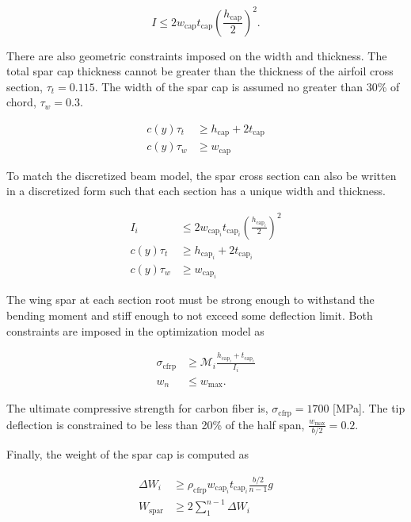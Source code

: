 \begin{equation}
    \label{e:moispar}
    I \leq 2w_{\text{cap}}t_{\text{cap}}\left(\frac{h_{\text{cap}}}{2}\right)^2.
\end{equation}

There are also geometric constraints imposed on the width and thickness.  The total spar cap thickness cannot be greater than the thickness of the airfoil cross section, $\tau_t = 0.115$.  The width of the spar cap is assumed no greater than 30\% of chord, $\tau_w = 0.3$.

\begin{align}
    \label{e:thickness}
    c(y)\tau_t &\geq h_{\text{cap}} + 2t_{\text{cap}} \\
    \label{e:width}
    c(y)\tau_w &\geq w_{\text{cap}} 
    \end{align}

To match the discretized beam model, the spar cross section can also be written in a discretized form such that each section has a unique width and thickness. 

\begin{align}
    I_i &\leq 2w_{\text{cap}_i}t_{\text{cap}_i}\left(\frac{h_{\text{cap}_i}}{2}\right)^2 \\
    c(y)\tau_t &\geq h_{\text{cap}_i} + 2t_{\text{cap}_i} \\
    c(y)\tau_w &\geq w_{\text{cap}_i} 
\end{align}

The wing spar at each section root must be strong enough to withstand the bending moment and stiff enough to not exceed some deflection limit.  Both constraints are imposed in the optimization model as

\begin{align}
    \label{e:stresscont}
    \sigma_{\text{cfrp}} &\geq \mathcal{M}_i \frac{h_{\text{cap}_i}+t_{\text{cap}_i}}{I_i}\\
    \label{e:defcont}
    w_n &\leq w_{\text{max}}.
\end{align}

The ultimate compressive strength for carbon fiber is, $\sigma_{\text{cfrp}} = 1700$ [MPa].\cite{cfprop}
The tip deflection is constrained to be less than 20\% of the half span, $\frac{w_{\text{max}}}{b/2} = 0.2$.

Finally, the weight of the spar cap is computed as

\begin{align}
    \label{e:sparmass}
    \Delta W_i &\geq \rho_{\text{cfrp}} w_{\text{cap}_i}t_{\text{cap}_i} \frac{b/2}{n-1}g \\
    \label{e:sparmasssum}
    W_{\text{spar}} &\geq 2 \sum\limits_{1}^{n-1} \Delta W_i
\end{align}

